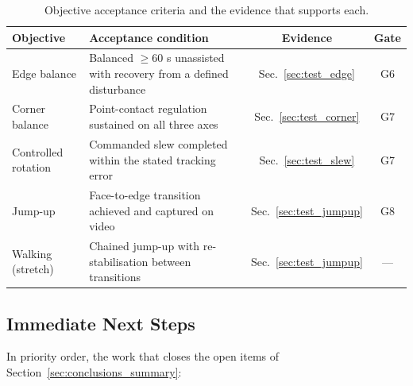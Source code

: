 \begin{table}[htbp]
\centering
\caption[Objective acceptance criteria and supporting evidence]{Objective acceptance criteria and the evidence that supports each.}
\label{tab:acceptance}
\small
\setlength{\tabcolsep}{4pt}
\begin{tabular}{L{3.0cm} L{6.4cm} c c}
\toprule
Objective & Acceptance condition & Evidence & Gate \\
\midrule
Edge balance & Balanced $\geq$60 s unassisted with recovery from a defined disturbance & Sec.~\ref{sec:test_edge} & G6 \\
Corner balance & Point-contact regulation sustained on all three axes & Sec.~\ref{sec:test_corner} & G7 \\
Controlled rotation & Commanded slew completed within the stated tracking error & Sec.~\ref{sec:test_slew} & G7 \\
Jump-up & Face-to-edge transition achieved and captured on video & Sec.~\ref{sec:test_jumpup} & G8 \\
Walking (stretch) & Chained jump-up with re-stabilisation between transitions & Sec.~\ref{sec:test_jumpup} & --- \\
\bottomrule
\end{tabular}
\end{table}

\subsection{Immediate Next Steps}
\label{sec:next_steps}

In priority order, the work that closes the open items of
Section~\ref{sec:conclusions_summary}:

